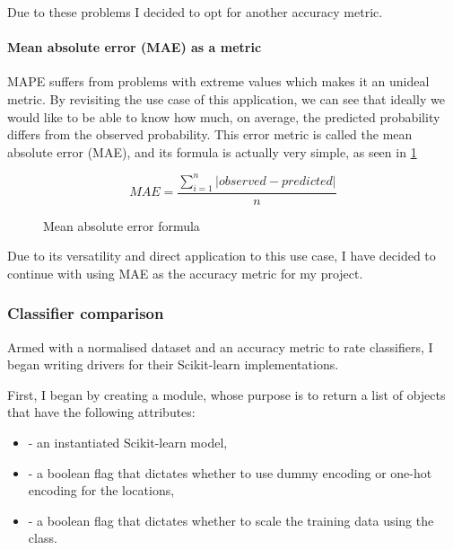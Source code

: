 \documentclass{article}
\begin{document}
	Due to these problems I decided to opt for another accuracy metric.

	\paragraph{Mean absolute error (MAE) as a metric}

	MAPE suffers from problems with extreme values which makes it an unideal metric. By revisiting the use case of this application, we can see that ideally we would like to be able to know how much, on average, the predicted probability differs from the observed probability. This error metric is called the mean absolute error (MAE), and its formula is actually very simple, as seen in \ref{fig:mae}

	\begin{figure}[H]
		\begin{equation} 
			MAE =  \frac{\sum\limits_{i=1}^n |observed - predicted|}{n}
		\end{equation}
		\caption{Mean absolute error formula}
		\label{fig:mae}
	\end{figure}

	Due to its versatility and direct application to this use case, I have decided to continue with using MAE as the accuracy metric for my project.

	\subsubsection{Classifier comparison}

	Armed with a normalised dataset and an accuracy metric to rate classifiers, I began writing drivers for their Scikit-learn implementations.

	First, I began by creating a  module, whose purpose is to return a list of  objects that have the following attributes:

	\begin{itemize}
		\item {} - an instantiated Scikit-learn model,
		\item {} - a boolean flag that dictates whether to use dummy encoding or one-hot encoding for the locations,
		\item {} - a boolean flag that dictates whether to scale the training data using the  class.
	\end{itemize}
\end{document}
